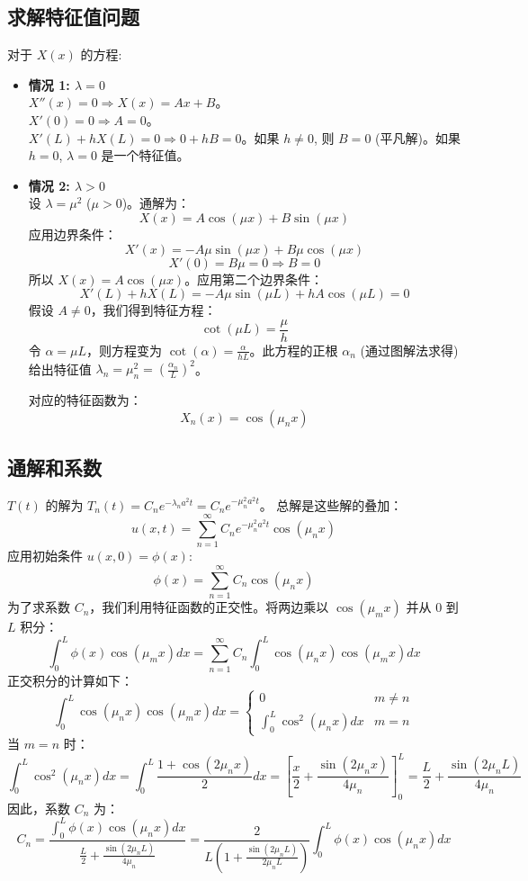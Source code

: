 \documentclass{article}
\begin{document}
	\subsection*{求解特征值问题}
	对于 $X(x)$ 的方程:
	\begin{itemize}
		\item \textbf{情况 1: $\lambda = 0$} \\
		$X''(x) = 0 \Rightarrow X(x) = Ax+B$。\\
		$X'(0)=0 \Rightarrow A=0$。\\
		$X'(L)+hX(L)=0 \Rightarrow 0+hB=0$。如果 $h \neq 0$, 则 $B=0$ (平凡解)。如果 $h=0$, $\lambda=0$ 是一个特征值。
		
		\item \textbf{情况 2: $\lambda > 0$} \\
		设 $\lambda = \mu^2$ ($\mu>0$)。通解为：
		$$ X(x) = A\cos(\mu x) + B\sin(\mu x) $$
		应用边界条件：
		$$ X'(x) = -A\mu\sin(\mu x) + B\mu\cos(\mu x) $$
		$$ X'(0) = B\mu = 0 \Rightarrow B=0 $$
		所以 $X(x) = A\cos(\mu x)$。应用第二个边界条件：
		$$ X'(L)+hX(L) = -A\mu\sin(\mu L) + hA\cos(\mu L) = 0 $$
		假设 $A \neq 0$，我们得到特征方程：
		$$ \cot(\mu L) = \frac{\mu}{h} $$
		令 $\alpha = \mu L$，则方程变为 $\cot(\alpha) = \frac{\alpha}{hL}$。此方程的正根 $\alpha_n$ (通过图解法求得) 给出特征值 $\lambda_n = \mu_n^2 = (\frac{\alpha_n}{L})^2$。
		
		对应的特征函数为：
		$$ X_n(x) = \cos(\mu_n x) $$
	\end{itemize}
	
	\subsection*{通解和系数}
	$T(t)$ 的解为 $T_n(t) = C_n e^{-\lambda_n a^2 t} = C_n e^{-\mu_n^2 a^2 t}$。
	总解是这些解的叠加：
	$$ u(x,t) = \sum_{n=1}^{\infty} C_n e^{-\mu_n^2 a^2 t} \cos(\mu_n x) $$
	应用初始条件 $u(x,0) = \phi(x)$:
	$$ \phi(x) = \sum_{n=1}^{\infty} C_n \cos(\mu_n x) $$
	为了求系数 $C_n$，我们利用特征函数的正交性。将两边乘以 $\cos(\mu_m x)$ 并从 $0$ 到 $L$ 积分：
	$$ \int_0^L \phi(x) \cos(\mu_m x) dx = \sum_{n=1}^{\infty} C_n \int_0^L \cos(\mu_n x) \cos(\mu_m x) dx $$
	正交积分的计算如下：
	$$ \int_0^L \cos(\mu_n x) \cos(\mu_m x) dx = 
	\begin{cases}
		0 & m \neq n \\
		\int_0^L \cos^2(\mu_n x) dx & m=n
	\end{cases}
	$$
	当 $m=n$ 时：
	$$ \int_0^L \cos^2(\mu_n x) dx = \int_0^L \frac{1+\cos(2\mu_n x)}{2} dx = \left[ \frac{x}{2} + \frac{\sin(2\mu_n x)}{4\mu_n} \right]_0^L = \frac{L}{2} + \frac{\sin(2\mu_n L)}{4\mu_n} $$
	因此，系数 $C_n$ 为：
	$$ C_n = \frac{\int_0^L \phi(x) \cos(\mu_n x) dx}{\frac{L}{2} + \frac{\sin(2\mu_n L)}{4\mu_n}} = \frac{2}{L(1+\frac{\sin(2\mu_n L)}{2\mu_n L})} \int_0^L \phi(x) \cos(\mu_n x) dx $$
	
\end{document}
